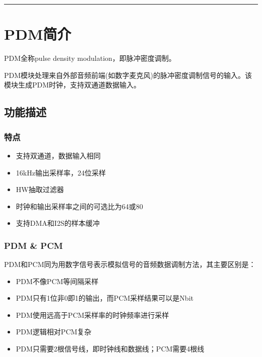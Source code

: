 \documentclass[
  12pt,
]{book}
\begin{document}
\begin{center}\rule{0.5\linewidth}{0.5pt}\end{center}

\hypertarget{ch-PDM}{%
\chapter{PDM简介}\label{ch-PDM}}

PDM全称pulse density modulation，即脉冲密度调制。

PDM模块处理来自外部音频前端(如数字麦克风)的脉冲密度调制信号的输入。该模块生成PDM时钟，支持双通道数据输入。

\hypertarget{ux529fux80fdux63cfux8ff0-3}{%
\section{功能描述}\label{ux529fux80fdux63cfux8ff0-3}}

\hypertarget{ux7279ux70b9-3}{%
\subsection{特点}\label{ux7279ux70b9-3}}

\begin{itemize}
\item
  支持双通道，数据输入相同
\item
  16kHz输出采样率，24位采样
\item
  HW抽取过滤器
\item
  时钟和输出采样率之间的可选比为64或80
\item
  支持DMA和I2S的样本缓冲
\end{itemize}

\hypertarget{pdm-pcm}{%
\subsection{PDM \& PCM}\label{pdm-pcm}}

PDM和PCM同为用数字信号表示模拟信号的音频数据调制方法，其主要区别是：

\begin{itemize}
\item
  PDM不像PCM等间隔采样
\item
  PDM只有1位非0即1的输出，而PCM采样结果可以是Nbit
\item
  PDM使用远高于PCM采样率的时钟频率进行采样
\item
  PDM逻辑相对PCM复杂
\item
  PDM只需要2根信号线，即时钟线和数据线；PCM需要4根线
\end{itemize}
\end{document}
